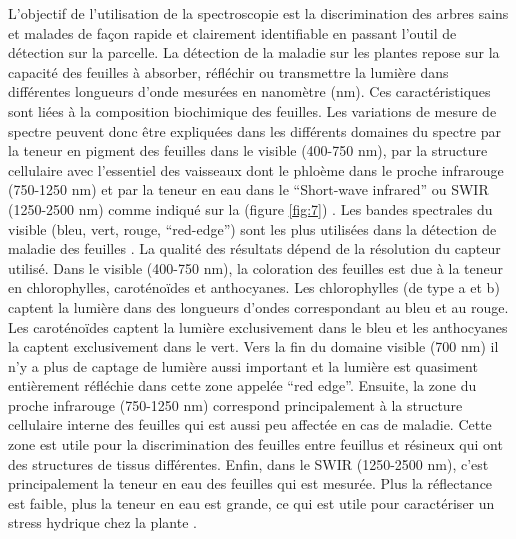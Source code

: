 \documentclass[
  11pt,
  french,
  a4paper,
  extrafontsizes,onecolumn,openright
  ]{memoir}
\begin{document}
L'objectif de l'utilisation de la spectroscopie est la discrimination des arbres sains et malades de façon rapide et clairement identifiable en passant l'outil de détection sur la parcelle. La détection de la maladie sur les plantes repose sur la capacité des feuilles à absorber, réfléchir ou transmettre la lumière dans différentes longueurs d'onde mesurées en nanomètre (nm). Ces caractéristiques sont liées à la composition biochimique des feuilles. Les variations de mesure de spectre peuvent donc être expliquées dans les différents domaines du spectre par la teneur en pigment des feuilles dans le visible (400-750 nm), par la structure cellulaire avec l'essentiel des vaisseaux dont le phloème dans le proche infrarouge (750-1250 nm) et par la teneur en eau dans le ``Short-wave infrared'' ou SWIR (1250-2500 nm) comme indiqué sur la (figure \ref{fig:7}\autocite{de_blomac_hyperspectral_2014}) \autocite{comar_etude_2013}. Les bandes spectrales du visible (bleu, vert, rouge, ``red-edge'') sont les plus utilisées dans la détection de maladie des feuilles \autocite{mishra_spectral_2007}. La qualité des résultats dépend de la résolution du capteur utilisé.
Dans le visible (400-750 nm), la coloration des feuilles est due à la teneur en chlorophylles, caroténoïdes et anthocyanes. Les chlorophylles (de type a et b) captent la lumière dans des longueurs d'ondes correspondant au bleu et au rouge.
Les caroténoïdes captent la lumière exclusivement dans le bleu et les anthocyanes la captent exclusivement dans le vert. Vers la fin du domaine visible (700 nm) il n'y a plus de captage de lumière aussi important et la lumière est quasiment entièrement réfléchie dans cette zone appelée ``red edge''.
Ensuite, la zone du proche infrarouge (750-1250 nm) correspond principalement à la structure cellulaire interne des feuilles qui est aussi peu affectée en cas de maladie. Cette zone est utile pour la discrimination des feuilles entre feuillus et résineux qui ont des structures de tissus différentes.
Enfin, dans le SWIR (1250-2500 nm), c'est principalement la teneur en eau des feuilles qui est mesurée. Plus la réflectance est faible, plus la teneur en eau est grande, ce qui est utile pour caractériser un stress hydrique chez la plante \autocite{albetis_de_la_cruz_potentiel_2018}.

\scriptsize
\end{document}
